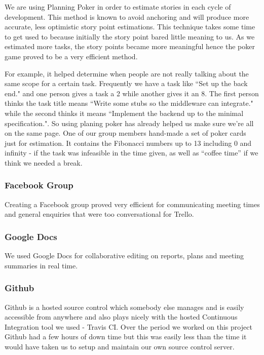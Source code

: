 \documentclass[11pt, a4paper]{article}
\begin{document}
We are using Planning Poker\cite{PlanningPoker} in order to estimate stories in each cycle of development.
This method is known to avoid anchoring and will produce more accurate, less optimistic story point estimations. This technique takes some time to get used to because initially the story point bared little meaning to us.
As we estimated more tasks, the story points became more meaningful hence the poker game proved to be a very efficient method.

For example, it helped determine when people are not really talking about the same scope for a certain task.
Frequently we have a task like ``Set up the back end." and one person gives a task a 2 while another gives it an 8.
The first person thinks the task title means ``Write some stubs so the middleware can integrate." while the second thinks it means ``Implement the backend up to the minimal specification.".
So using planing poker has already helped us make sure we're all on the same page.
One of our group members hand-made a set of poker cards just for estimation.
It contains the Fibonacci numbers up to 13 including 0 and infinity - if the task was infeasible in the time given, as well as ``coffee time'' if we think we needed a break.

\subsubsection{Facebook Group}
Creating a Facebook group proved very efficient for communicating meeting times and general enquiries that were too conversational for Trello.

\subsubsection{Google Docs}
We used Google Docs for collaborative editing on reports, plans and meeting summaries in real time.

\subsubsection{Github}
Github is a hosted source control which somebody else manages and is easily accessible from anywhere and also plays nicely with the hosted Continuous Integration tool we used - Travis CI.
Over the period we worked on this project Github had a few hours of down time but this was easily less than the time it would have taken us to setup and maintain our own source control server.
\end{document}
